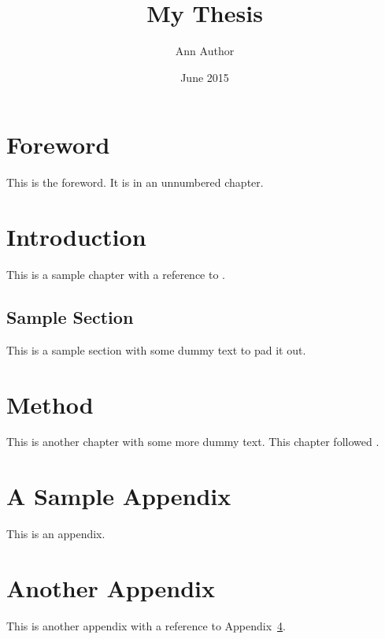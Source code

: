 \documentclass[oneside]{scrbook}
\title{My Thesis}
\author{Ann Author}
\date{June 2015}
\begin{document}
\maketitle

\frontmatter
\tableofcontents

\chapter{Foreword}

This is the foreword.
It is in an unnumbered chapter.

\mainmatter
\chapter{Introduction}

This is a sample chapter with a reference to .

\section{Sample Section}\label{sec:sample}

This is a sample section with some dummy text to pad it out.
\kant[1]

\chapter{Method}\label{chap:method}

This is another chapter with some more dummy text.
\kant[2]
This chapter followed .

\appendix %

\chapter{A Sample Appendix}\label{apd:sample}

This is an appendix.
\kant[3]

\chapter{Another Appendix}

This is another appendix with a reference to Appendix~\ref{apd:sample}.
\kant[4]
\end{document}
